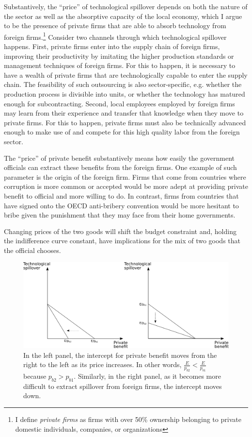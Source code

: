 Substantively, the ``price'' of technological spillover depends on both the nature of the sector as well as the absorptive capacity of the local economy, which I argue to be the presence of private firms that are able to absorb technology from foreign firms.\footnote{I define \textit{private firms} as firms with over 50\% ownership belonging to private domestic individuals, companies, or organizations} Consider two channels through which technological spillover happens. First, private firms enter into the supply chain of foreign firms, improving their productivity by imitating the higher production standards or management techniques of foreign firms. For this to happen, it is necessary to have a wealth of private firms that are technologically capable to enter the supply chain. The feasibility of such outsourcing is also sector-specific, e.g. whether the production process is divisible into units, or whether the technology has matured enough for subcontracting. Second, local employees employed by foreign firms may learn from their experience and transfer that knowledge when they move to private firms. For this to happen, private firms must also be technically advanced enough to make use of and compete for this high quality labor from the foreign sector.

The ``price'' of private benefit substantively means how easily the government officials can extract these benefits from the foreign firms. One example of such parameter is the origin of the foreign firm. Firms that come from countries where corruption is more common or accepted would be more adept at providing private benefit to official and more willing to do. In contrast, firms from countries that have signed onto the OECD anti-bribery convention would be more hesitant to bribe given the punishment that they may face from their home governments.

Changing prices of the two goods will shift the budget constraint and, holding the indifference curve constant, have implications for the mix of two goods that the official chooses.

\begin{figure}[!ht]
	\centering
    \includegraphics[width=\textwidth, height=\textheight,keepaspectratio]{../figure/absorptive_capacity}
    \caption{In the left panel, the intercept for private benefit moves from the right to the left as its price increases. In other words, $\frac{E}{p_{b2}} < \frac{E}{p_{b1}}$ because $p_{b2} > p_{b1}$. Similarly, in the right panel, as it becomes more difficult to extract spillover from foreign firms, the intercept moves down.}
    \label{fig:relative_price}
\end{figure}

